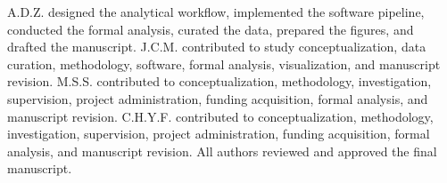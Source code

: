 A.D.Z. designed the analytical workflow, implemented the software pipeline, conducted the formal analysis, curated the data, prepared the figures, and drafted the manuscript. J.C.M. contributed to study conceptualization, data curation, methodology, software, formal analysis, visualization, and manuscript revision. M.S.S. contributed to conceptualization, methodology, investigation, supervision, project administration, funding acquisition, formal analysis, and manuscript revision. C.H.Y.F. contributed to conceptualization, methodology, investigation, supervision, project administration, funding acquisition, formal analysis, and manuscript revision. All authors reviewed and approved the final manuscript.
